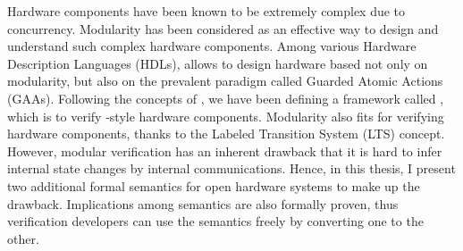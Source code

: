% 
% 
%

Hardware components have been known to be extremely complex due to
concurrency. Modularity has been considered as an effective way to
design and understand such complex hardware components. Among various
Hardware Description Languages (HDLs), \Bluespec{} allows to design
hardware based not only on modularity, but also on the prevalent
paradigm called Guarded Atomic Actions (GAAs). Following the concepts
of \Bluespec{}, we have been defining a framework called \Kami{},
which is to verify \Bluespec{}-style hardware components. Modularity
also fits for verifying hardware components, thanks to the Labeled
Transition System (LTS) concept. However, modular verification has an
inherent drawback that it is hard to infer internal state changes by
internal communications. Hence, in this thesis, I present two
additional formal semantics for open hardware systems to make up the
drawback. Implications among semantics are also formally proven, thus
verification developers can use the semantics freely by converting one
to the other.
